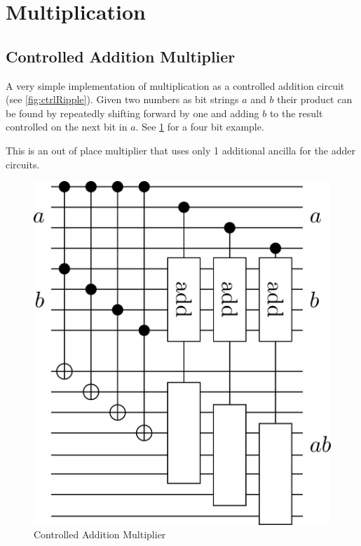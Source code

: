 
\section{Multiplication}
  \subsection{Controlled Addition Multiplier}
    A very simple implementation of multiplication as a controlled addition circuit (see \cref{fig:ctrlRipple}).
    Given two numbers as bit strings $a$ and $b$ their product can be found by repeatedly shifting forward by one and adding $b$ to the result controlled on the next bit in $a$.
    See \cref{fig:multAdd} for a four bit example.

    This is an out of place multiplier that uses only 1 additional ancilla for the adder circuits.
    \begin{figure}[ht]
      \capstart
      \centering
      \includegraphics[scale=0.25]{images/multCtrlAdd}
      \caption{Controlled Addition Multiplier}
      \label{fig:multAdd}
    \end{figure}
